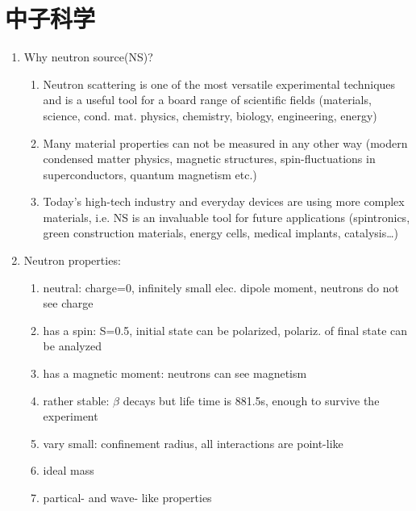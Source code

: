 \documentclass[12pt,a4paper]{article}
\begin{document}
\section{中子科学}
\begin{enumerate}
    \item Why neutron source(NS)?
        \begin{enumerate}
            \item Neutron scattering is one of the most versatile experimental techniques and is a useful tool for a board range of scientific 
                fields (materials, science, cond. mat. physics, chemistry, biology, engineering, energy)
            \item Many material properties can not be measured in any other way (modern condensed matter physics, magnetic structures, spin-fluctuations in superconductors, quantum magnetism etc.)
            \item Today's high-tech industry and everyday devices are using more complex materials, i.e. NS is an invaluable tool for future applications (spintronics, green construction materials, 
                energy cells, medical implants, catalysis\dots)
        \end{enumerate}
    \item Neutron properties:
        \begin{enumerate}
            \item neutral: charge=0, infinitely small elec. dipole moment, neutrons do not see charge
            \item has a spin: S=0.5, initial state can be polarized, polariz. of final state can be analyzed
            \item has a magnetic moment: neutrons can see magnetism
            \item rather stable: $\beta$ decays but life time is 881.5s, enough to survive the experiment
            \item vary small: confinement radius, all interactions are point-like
            \item ideal mass
            \item partical- and wave- like properties
        \end{enumerate}
\end{enumerate}
\end{document}
